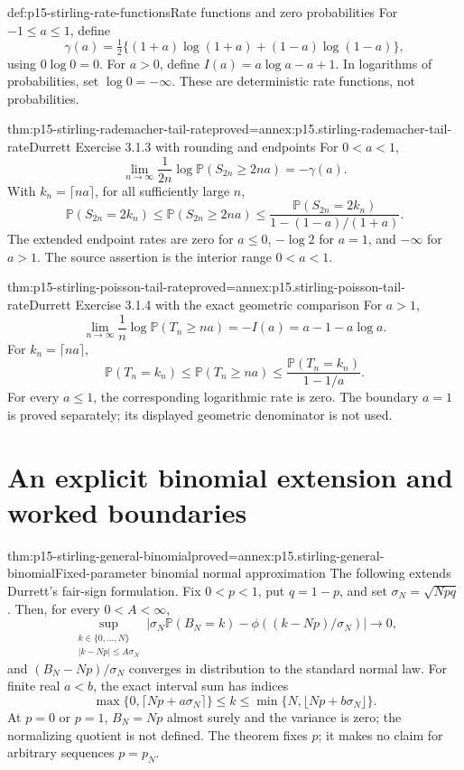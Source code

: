 \begin{hbdefinition}{def:p15-stirling-rate-functions}{Rate functions and zero probabilities}
For \(-1\leq a\leq1\), define
\[
 \gamma(a)=\tfrac12\{(1+a)\log(1+a)+(1-a)\log(1-a)\},
\]
using \(0\log0=0\).
For \(a>0\), define \(I(a)=a\log a-a+1\).
In logarithms of probabilities, set \(\log0=-\infty\).
These are deterministic rate functions, not probabilities.
\end{hbdefinition}

\begin{hbtheorem}{thm:p15-stirling-rademacher-tail-rate}{proved=annex:p15.stirling-rademacher-tail-rate}{Durrett Exercise 3.1.3 with rounding and endpoints}
For \(0<a<1\),
\[
 \lim_{n\to\infty}\frac1{2n}
       \log\mathbb P(S_{2n}\geq2na)=-\gamma(a).
\]
With \(k_n=\lceil na\rceil\), for all sufficiently large \(n\),
\[
 \mathbb P(S_{2n}=2k_n)
 \leq\mathbb P(S_{2n}\geq2na)
 \leq\frac{\mathbb P(S_{2n}=2k_n)}{1-(1-a)/(1+a)}.
\]
The extended endpoint rates are zero for \(a\leq0\),
\(-\log2\) for \(a=1\), and \(-\infty\) for \(a>1\).
The source assertion is the interior range \(0<a<1\).
\end{hbtheorem}

\begin{hbtheorem}{thm:p15-stirling-poisson-tail-rate}{proved=annex:p15.stirling-poisson-tail-rate}{Durrett Exercise 3.1.4 with the exact geometric comparison}
For \(a>1\),
\[
 \lim_{n\to\infty}\frac1n
       \log\mathbb P(T_n\geq na)
       =-I(a)=a-1-a\log a.
\]
For \(k_n=\lceil na\rceil\),
\[
 \mathbb P(T_n=k_n)
 \leq\mathbb P(T_n\geq na)
 \leq\frac{\mathbb P(T_n=k_n)}{1-1/a}.
\]
For every \(a\leq1\), the corresponding logarithmic rate is zero.
The boundary \(a=1\) is proved separately; its displayed geometric
denominator is not used.
\end{hbtheorem}

\section{An explicit binomial extension and worked boundaries}
\label{sec:p15-stirling-binomial-extension}

\begin{hbtheorem}{thm:p15-stirling-general-binomial}{proved=annex:p15.stirling-general-binomial}{Fixed-parameter binomial normal approximation}
The following extends Durrett's fair-sign formulation.
Fix \(0<p<1\), put \(q=1-p\), and set \(\sigma_N=\sqrt{Npq}\).
Then, for every \(0<A<\infty\),
\[
 \sup_{\substack{k\in\{0,\ldots,N\}\\ |k-Np|\leq A\sigma_N}}
 \left|\sigma_N\mathbb P(B_N=k)
       -\phi((k-Np)/\sigma_N)\right|\longrightarrow0,
\]
and \((B_N-Np)/\sigma_N\) converges in distribution to the
standard normal law. For finite real \(a<b\), the exact interval sum has
indices
\[
 \max\{0,\lceil Np+a\sigma_N\rceil\}
       \leq k\leq\min\{N,\lfloor Np+b\sigma_N\rfloor\}.
\]
At \(p=0\) or \(p=1\), \(B_N=Np\) almost surely and the
variance is zero; the normalizing quotient is not defined.
The theorem fixes \(p\); it makes no claim for arbitrary
sequences \(p=p_N\).
\end{hbtheorem}

